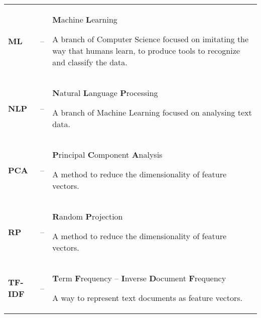 {\begin{longtable}{>{\bfseries}l l p{}}
        ML
        &–&
        \textbf{M}achine \textbf{L}earning
        \par
        \small
        A branch of Computer Science focused on imitating the way that humans learn, to produce tools to recognize and classify the data.
        \\

        NLP
        &–&
        \textbf{N}atural \textbf{L}anguage \textbf{P}rocessing
        \par
        \small
        A branch of Machine Learning focused on analysing text data.
        \\

        PCA
        &–&
        \textbf{P}rincipal \textbf{C}omponent \textbf{A}nalysis
        \par
        \small
        A method to reduce the dimensionality of feature vectors.
        \\

        RP
        &–&
        \textbf{R}andom \textbf{P}rojection
        \par
        \small
        A method to reduce the dimensionality of feature vectors.
        \\

        TF-IDF
        &–&
        \textbf{T}erm \textbf{F}requency – \textbf{I}nverse \textbf{D}ocument \textbf{F}requency
        \par
        \small
        A way to represent text documents as feature vectors.
        \\
    \end{longtable}
}
